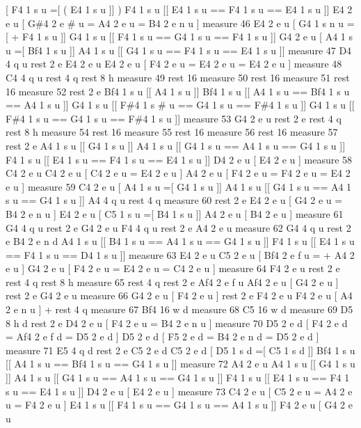 \mbox{[} F4 1 s u =\mbox{[} ( E4 1 s u \mbox{]}\mbox{]} ) F4 1 s u \mbox{[}\mbox{[} E4 1 s u == F4 1 s u == E4 1 s u \mbox{]}\mbox{]} E4 2 e u \mbox{[} G\#4 2 e \# u = A4 2 e u = B4 2 e n u \mbox{]} measure 46 E4 2 e u \mbox{[} G4 1 s n u =\mbox{[} + F4 1 s u \mbox{]}\mbox{]} G4 1 s u \mbox{[}\mbox{[} F4 1 s u == G4 1 s u == F4 1 s u \mbox{]}\mbox{]} G4 2 e u \mbox{[} A4 1 s u =\mbox{[} Bf4 1 s u \mbox{]}\mbox{]} A4 1 s u \mbox{[}\mbox{[} G4 1 s u == F4 1 s u == E4 1 s u \mbox{]}\mbox{]} measure 47 D4 4 q u rest 2 e E4 2 e u E4 2 e u \mbox{[} F4 2 e u = E4 2 e u = E4 2 e u \mbox{]} measure 48 C4 4 q u rest 4 q rest 8 h measure 49 rest 16 measure 50 rest 16 measure 51 rest 16 measure 52 rest 2 e Bf4 1 s u \mbox{[}\mbox{[} A4 1 s u \mbox{]}\mbox{]} Bf4 1 s u \mbox{[}\mbox{[} A4 1 s u == Bf4 1 s u == A4 1 s u \mbox{]}\mbox{]} G4 1 s u \mbox{[}\mbox{[} F\#4 1 s \# u == G4 1 s u == F\#4 1 s u \mbox{]}\mbox{]} G4 1 s u \mbox{[}\mbox{[} F\#4 1 s u == G4 1 s u == F\#4 1 s u \mbox{]}\mbox{]} measure 53 G4 2 e u rest 2 e rest 4 q rest 8 h measure 54 rest 16 measure 55 rest 16 measure 56 rest 16 measure 57 rest 2 e A4 1 s u \mbox{[}\mbox{[} G4 1 s u \mbox{]}\mbox{]} A4 1 s u \mbox{[}\mbox{[} G4 1 s u == A4 1 s u == G4 1 s u \mbox{]}\mbox{]} F4 1 s u \mbox{[}\mbox{[} E4 1 s u == F4 1 s u == E4 1 s u \mbox{]}\mbox{]} D4 2 e u \mbox{[} E4 2 e u \mbox{]} measure 58 C4 2 e u C4 2 e u \mbox{[} C4 2 e u = E4 2 e u \mbox{]} A4 2 e u \mbox{[} F4 2 e u = F4 2 e u = E4 2 e u \mbox{]} measure 59 C4 2 e u \mbox{[} A4 1 s u =\mbox{[} G4 1 s u \mbox{]}\mbox{]} A4 1 s u \mbox{[}\mbox{[} G4 1 s u == A4 1 s u == G4 1 s u \mbox{]}\mbox{]} A4 4 q u rest 4 q measure 60 rest 2 e E4 2 e u \mbox{[} G4 2 e u = B4 2 e n u \mbox{]} E4 2 e u \mbox{[} C5 1 s u =\mbox{[} B4 1 s u \mbox{]}\mbox{]} A4 2 e u \mbox{[} B4 2 e u \mbox{]} measure 61 G4 4 q u rest 2 e G4 2 e u F4 4 q u rest 2 e A4 2 e u measure 62 G4 4 q u rest 2 e B4 2 e n d A4 1 s u \mbox{[}\mbox{[} B4 1 s u == A4 1 s u == G4 1 s u \mbox{]}\mbox{]} F4 1 s u \mbox{[}\mbox{[} E4 1 s u == F4 1 s u == D4 1 s u \mbox{]}\mbox{]} measure 63 E4 2 e u C5 2 e u \mbox{[} Bf4 2 e f u = + A4 2 e u \mbox{]} G4 2 e u \mbox{[} F4 2 e u = E4 2 e u = C4 2 e u \mbox{]} measure 64 F4 2 e u rest 2 e rest 4 q rest 8 h measure 65 rest 4 q rest 2 e Af4 2 e f u Af4 2 e u \mbox{[} G4 2 e u \mbox{]} rest 2 e G4 2 e u measure 66 G4 2 e u \mbox{[} F4 2 e u \mbox{]} rest 2 e F4 2 e u F4 2 e u \mbox{[} A4 2 e n u \mbox{]} + rest 4 q measure 67 Bf4 16 w d measure 68 C5 16 w d measure 69 D5 8 h d rest 2 e D4 2 e u \mbox{[} F4 2 e u = B4 2 e n u \mbox{]} measure 70 D5 2 e d \mbox{[} F4 2 e d = Af4 2 e f d = D5 2 e d \mbox{]} D5 2 e d \mbox{[} F5 2 e d = B4 2 e n d = D5 2 e d \mbox{]} measure 71 E5 4 q d rest 2 e C5 2 e d C5 2 e d \mbox{[} D5 1 s d =\mbox{[} C5 1 s d \mbox{]}\mbox{]} Bf4 1 s u \mbox{[}\mbox{[} A4 1 s u == Bf4 1 s u == G4 1 s u \mbox{]}\mbox{]} measure 72 A4 2 e u A4 1 s u \mbox{[}\mbox{[} G4 1 s u \mbox{]}\mbox{]} A4 1 s u \mbox{[}\mbox{[} G4 1 s u == A4 1 s u == G4 1 s u \mbox{]}\mbox{]} F4 1 s u \mbox{[}\mbox{[} E4 1 s u == F4 1 s u == E4 1 s u \mbox{]}\mbox{]} D4 2 e u \mbox{[} E4 2 e u \mbox{]} measure 73 C4 2 e u \mbox{[} C5 2 e u = A4 2 e u = F4 2 e u \mbox{]} E4 1 s u \mbox{[}\mbox{[} F4 1 s u == G4 1 s u == A4 1 s u \mbox{]}\mbox{]} F4 2 e u \mbox{[} G4 2 e u 